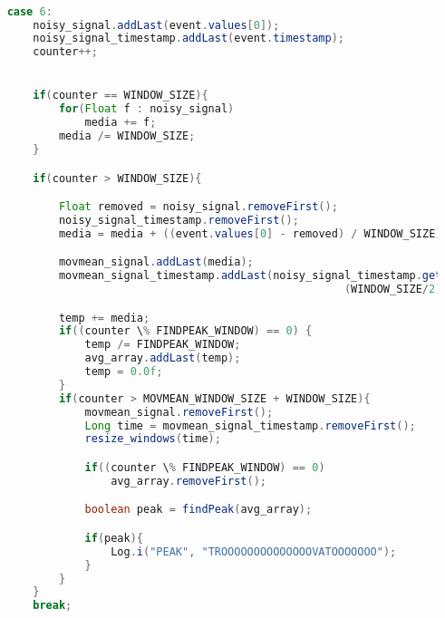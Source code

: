 \begin{lstlisting}[language=Java,  basicstyle=\footnotesize]

    case 6:
        noisy_signal.addLast(event.values[0]);
        noisy_signal_timestamp.addLast(event.timestamp);
        counter++;


        if(counter == WINDOW_SIZE){
            for(Float f : noisy_signal)
                media += f;
            media /= WINDOW_SIZE;
        }

        if(counter > WINDOW_SIZE){

            Float removed = noisy_signal.removeFirst();
            noisy_signal_timestamp.removeFirst();
            media = media + ((event.values[0] - removed) / WINDOW_SIZE);

            movmean_signal.addLast(media);
            movmean_signal_timestamp.addLast(noisy_signal_timestamp.get
                                                        (WINDOW_SIZE/2));

            temp += media;
            if((counter \% FINDPEAK_WINDOW) == 0) {
                temp /= FINDPEAK_WINDOW;
                avg_array.addLast(temp);
                temp = 0.0f;
            }
            if(counter > MOVMEAN_WINDOW_SIZE + WINDOW_SIZE){
                movmean_signal.removeFirst();
                Long time = movmean_signal_timestamp.removeFirst();
                resize_windows(time);

                if((counter \% FINDPEAK_WINDOW) == 0)
                    avg_array.removeFirst();

                boolean peak = findPeak(avg_array);

                if(peak){
                    Log.i("PEAK", "TROOOOOOOOOOOOOOVATOOOOOOO");
                }
            }
        }
        break;
\end{lstlisting}